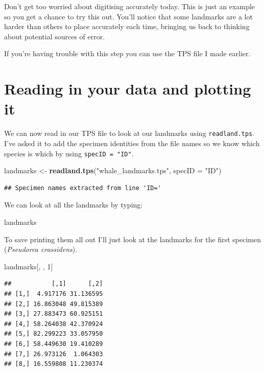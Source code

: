 \documentclass[]{book}
\newenvironment{Shaded}{\begin{snugshade}}{\end{snugshade}}
\newcommand{\KeywordTok}[1]{\textcolor[rgb]{0.13,0.29,0.53}{\textbf{{#1}}}}
\newcommand{\DataTypeTok}[1]{\textcolor[rgb]{0.13,0.29,0.53}{{#1}}}
\newcommand{\DecValTok}[1]{\textcolor[rgb]{0.00,0.00,0.81}{{#1}}}
\newcommand{\StringTok}[1]{\textcolor[rgb]{0.31,0.60,0.02}{{#1}}}
\newcommand{\NormalTok}[1]{{#1}}
\theoremstyle{definition}
\theoremstyle{definition}
\theoremstyle{definition}
\theoremstyle{remark}
\begin{document}
Don't get too worried about digitising accurately today. This is just an
example so you get a chance to try this out. You'll notice that some
landmarks are a lot harder than others to place accurately each time,
bringing us back to thinking about potential sources of error.

If you're having trouble with this step you can use the TPS file I made
earlier.

\section{Reading in your data and plotting
it}\label{reading-in-your-data-and-plotting-it}

We can now read in our TPS file to look at our landmarks using
\texttt{readland.tps}. I've asked it to add the specimen identities from
the file names so we know which species is which by using
\texttt{specID\ =\ "ID"}.

\begin{Shaded}
\begin{Highlighting}[]
\NormalTok{landmarks <-}\StringTok{ }\KeywordTok{readland.tps}\NormalTok{(}\StringTok{"whale_landmarks.tps"}\NormalTok{, }\DataTypeTok{specID =} \StringTok{"ID"}\NormalTok{)}
\end{Highlighting}
\end{Shaded}

\begin{verbatim}
## Specimen names extracted from line 'ID='
\end{verbatim}

We can look at all the landmarks by typing:

\begin{Shaded}
\begin{Highlighting}[]
\NormalTok{landmarks}
\end{Highlighting}
\end{Shaded}

To save printing them all out I'll just look at the landmarks for the
first specimen (\emph{Pseudorca crassidens}).

\begin{Shaded}
\begin{Highlighting}[]
\NormalTok{landmarks[, , }\DecValTok{1}\NormalTok{]}
\end{Highlighting}
\end{Shaded}

\begin{verbatim}
##           [,1]      [,2]
## [1,]  4.917176 31.136595
## [2,] 16.863048 49.815389
## [3,] 27.883473 60.925151
## [4,] 58.264038 42.370924
## [5,] 82.299223 33.057950
## [6,] 58.449630 19.410289
## [7,] 26.973126  1.064303
## [8,] 16.559808 11.230374
\end{verbatim}
\end{document}
